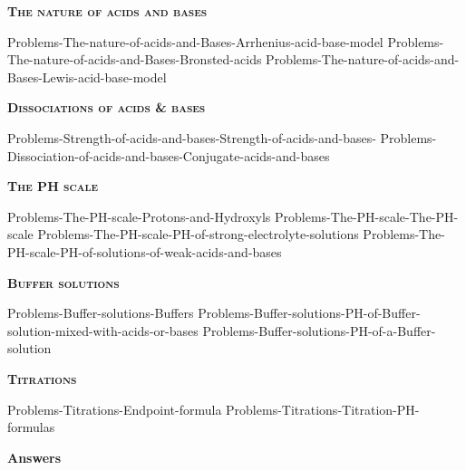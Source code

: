 \documentclass[main.tex]{subfiles}
\begin{document}
\newpage
 
\fancyhfoffset[E,O]{0pt}
\setlength{\columnsep}{30pt}
\begin{conclusion}
\end{conclusion}
\begin{multicols*}{2}\setcounter{numA}{1}
{\raggedright\textsc{\textbf{The nature of acids and bases}}\par}
 {Problems-The-nature-of-acids-and-Bases-Arrhenius-acid-base-model}
 {Problems-The-nature-of-acids-and-Bases-Bronsted-acids}
 {Problems-The-nature-of-acids-and-Bases-Lewis-acid-base-model}
{\raggedright\textsc{\textbf{Dissociations of acids \& bases}}\par}
 {Problems-Strength-of-acids-and-bases-Strength-of-acids-and-bases-}
 {Problems-Dissociation-of-acids-and-bases-Conjugate-acids-and-bases}
 
{\raggedright\textsc{\textbf{The PH scale}}\par}
 {Problems-The-PH-scale-Protons-and-Hydroxyls}
 {Problems-The-PH-scale-The-PH-scale}
 {Problems-The-PH-scale-PH-of-strong-electrolyte-solutions}
 {Problems-The-PH-scale-PH-of-solutions-of-weak-acids-and-bases}
			
{\raggedright\textsc{\textbf{Buffer solutions}}\par}
 {Problems-Buffer-solutions-Buffers}
 {Problems-Buffer-solutions-PH-of-Buffer-solution-mixed-with-acids-or-bases}
 {Problems-Buffer-solutions-PH-of-a-Buffer-solution}
{\raggedright\textsc{\textbf{Titrations}}\par}
 {Problems-Titrations-Endpoint-formula}
 {Problems-Titrations-Titration-PH-formulas}
\end{multicols*}
\newpage
\begin{answersenvironment}
\begin{minipage}[c]{1\textwidth}
\begin{localsize}{10}
{\Large \bf Answers}
  \printsolutions[byID={1,3,5,7,9,11,13,15,17,19,21,23,25,27,29,31,33,35,37}]
\end{localsize}
\end{minipage}\end{answersenvironment}
\end{document}
